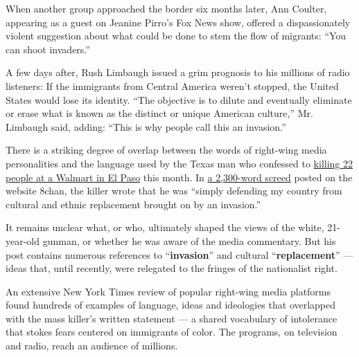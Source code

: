 When another group approached the border six months later, Ann Coulter,
appearing as a guest on Jeanine Pirro's Fox News show, offered a
dispassionately violent suggestion about what could be done to stem the
flow of migrants: ``You can shoot invaders.''

A few days after, Rush Limbaugh issued a grim prognosis to his millions
of radio listeners: If the immigrants from Central America weren't
stopped, the United States would lose its identity. ``The objective is
to dilute and eventually eliminate or erase what is known as the
distinct or unique American culture,'' Mr. Limbaugh said, adding: ``This
is why people call this an invasion.''

There is a striking degree of overlap between the words of right-wing
media personalities and the language used by the Texas man who confessed
to
\href{https://www.nytimes3xbfgragh.onion/2019/08/04/us/el-paso-shooting-updates.html}{killing
22 people at a Walmart in El Paso} this month. In
\href{https://www.nytimes3xbfgragh.onion/2019/08/03/us/patrick-crusius-el-paso-shooter-manifesto.html?module=inline}{a
2,300-word screed} posted on the website 8chan, the killer wrote that he
was ``simply defending my country from cultural and ethnic replacement
brought on by an invasion.''

It remains unclear what, or who, ultimately shaped the views of the
white, 21-year-old gunman, or whether he was aware of the media
commentary. But his post contains numerous references to
``\textbf{invasion}'' and cultural ``\textbf{replacement}'' --- ideas
that, until recently, were relegated to the fringes of the nationalist
right.

An extensive New York Times review of popular right-wing media platforms
found hundreds of examples of language, ideas and ideologies that
overlapped with the mass killer's written statement --- a shared
vocabulary of intolerance that stokes fears centered on immigrants of
color. The programs, on television and radio, reach an audience of
millions.

